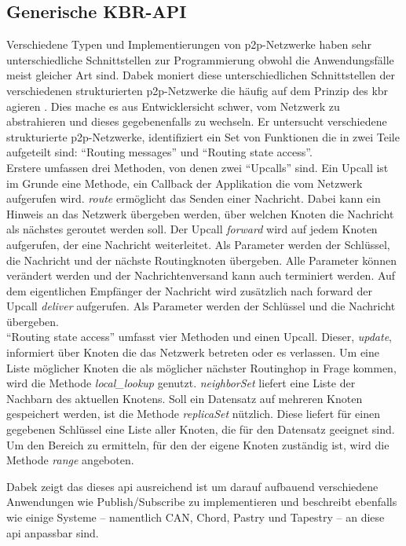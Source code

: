 \subsection{Generische KBR-API}
\label{chap:grundlagen:api}
Verschiedene Typen und Implementierungen von p2p-Netzwerke haben sehr unterschiedliche Schnittstellen zur Programmierung obwohl die Anwendungsfälle meist gleicher Art sind. Dabek moniert diese unterschiedlichen Schnittstellen der verschiedenen strukturierten p2p-Netzwerke die häufig auf dem Prinzip des \ac{kbr} agieren \cite{Dabek2003Towards}. Dies mache es aus Entwicklersicht schwer, vom Netzwerk zu abstrahieren und dieses gegebenenfalls zu wechseln. Er untersucht verschiedene strukturierte p2p-Netzwerke, identifiziert ein Set von Funktionen die in zwei Teile aufgeteilt sind: ``Routing messages'' und ``Routing state access''.\\
Erstere umfassen drei Methoden, von denen zwei ``Upcalls'' sind. Ein Upcall ist im Grunde eine Methode, ein Callback der Applikation die vom Netzwerk aufgerufen wird. \emph{route} ermöglicht das Senden einer Nachricht. Dabei kann ein Hinweis an das Netzwerk übergeben werden, über welchen Knoten die Nachricht als nächstes geroutet werden soll. Der Upcall \emph{forward} wird auf jedem Knoten aufgerufen, der eine Nachricht weiterleitet. Als Parameter werden der Schlüssel, die Nachricht und der nächste Routingknoten übergeben. Alle Parameter können verändert werden und der Nachrichtenversand kann auch terminiert werden. Auf dem eigentlichen Empfänger der Nachricht wird zusätzlich nach forward der Upcall \emph{deliver} aufgerufen. Als Parameter werden der Schlüssel und die Nachricht übergeben.\\
``Routing state access'' umfasst vier Methoden und einen Upcall. Dieser, \emph{update}, informiert über Knoten die das Netzwerk betreten oder es verlassen. Um eine Liste möglicher Knoten die als möglicher nächster Routinghop in Frage kommen, wird die Methode \emph{local\_lookup} genutzt. \emph{neighborSet} liefert eine Liste der Nachbarn des aktuellen Knotens. Soll ein Datensatz auf mehreren Knoten gespeichert werden, ist die Methode \emph{replicaSet} nützlich. Diese liefert für einen gegebenen Schlüssel eine Liste aller Knoten, die für den Datensatz geeignet sind. Um den Bereich zu ermitteln, für den der eigene Knoten zuständig ist, wird die Methode \emph{range} angeboten.

Dabek zeigt das dieses \acf{api} ausreichend ist um darauf aufbauend verschiedene Anwendungen wie Publish/Subscribe zu implementieren und beschreibt ebenfalls wie einige Systeme -- namentlich CAN, Chord, Pastry und Tapestry -- an diese \ac{api} anpassbar sind.
